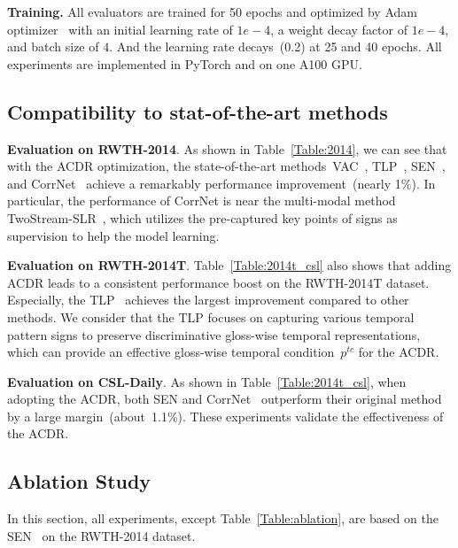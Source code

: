 \documentclass[sigconf]{acmart}
\begin{document}
\noindent \textbf{Training.}
All evaluators are trained for 50 epochs and optimized by Adam optimizer~\cite{kingma2014adam} with an initial learning rate of $1e-4$, a weight decay factor of $1e-4$, and batch size of $4$.
And the learning rate decays~(0.2) at 25 and 40 epochs.
All experiments are implemented in PyTorch and on one A100 GPU.

\subsection{Compatibility to stat-of-the-art methods}
\label{sec:sota}

\noindent \textbf{Evaluation on RWTH-2014}.
As shown in Table~\ref{Table:2014}, we can see that with the ACDR optimization, the state-of-the-art methods~VAC~\cite{min2021visual},
TLP~\cite{hu2022temporal}, SEN~\cite{Hu2022SelfEmphasizingNF}, and CorrNet~\cite{hu2023continuous} achieve a remarkably performance improvement~(nearly 1\%). 
In particular, the performance of CorrNet is near the multi-modal method TwoStream-SLR~\cite{chen2022two}, which utilizes the pre-captured key points of signs as supervision to help the model learning.

\noindent \textbf{Evaluation on RWTH-2014T}.
Table~\ref{Table:2014t_csl} also shows that adding ACDR leads to a consistent performance boost on the RWTH-2014T dataset. 
Especially, the TLP~\cite{hu2022temporal} achieves the largest improvement compared to other methods.
We consider that the TLP focuses on capturing various temporal pattern signs to preserve discriminative gloss-wise temporal representations, which can provide an effective  gloss-wise temporal condition~$p^{tc}$ for the ACDR.

\noindent \textbf{Evaluation on CSL-Daily}.
As shown in Table~\ref{Table:2014t_csl}, when adopting the ACDR, both SEN\cite{Hu2022SelfEmphasizingNF} and CorrNet~\cite{hu2023continuous} outperform their original method by a large margin~(about~1.1\%).
These experiments validate the effectiveness of the ACDR.

\subsection{Ablation Study}
\label{sec:ablation}
In this section, all experiments, except Table~\ref{Table:ablation}, are based on the SEN~\cite{Hu2022SelfEmphasizingNF} on the RWTH-2014 dataset.
\end{document}
